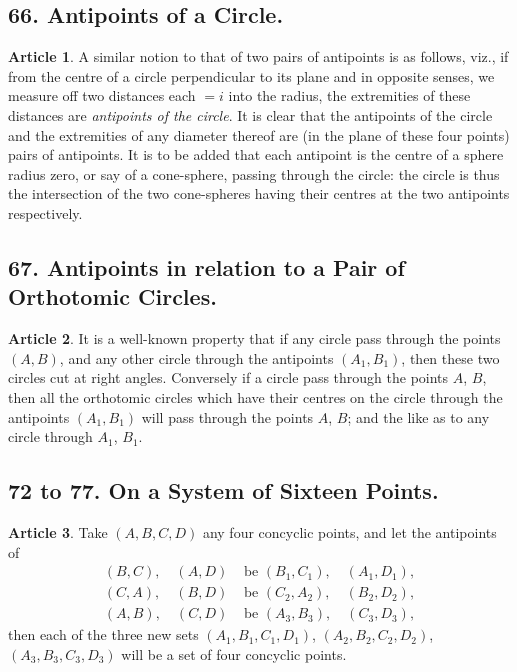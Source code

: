 \documentclass[11pt,a4paper]{article}
\theoremstyle{definition}
\newtheorem{art}{Article}
\begin{document}
\subsection{66. Antipoints of a Circle.}

\begin{art}
A similar notion to that of two pairs of antipoints is as follows, viz., if from the centre of a circle perpendicular to its plane and in opposite senses, we measure off two distances each $= i$ into the radius, the extremities of these distances are \textit{antipoints of the circle}. It is clear that the antipoints of the circle and the extremities of any diameter thereof are (in the plane of these four points) pairs of antipoints. It is to be added that each antipoint is the centre of a sphere radius zero, or say of a cone-sphere, passing through the circle: the circle is thus the intersection of the two cone-spheres having their centres at the two antipoints respectively.
\end{art}

\subsection{67. Antipoints in relation to a Pair of Orthotomic Circles.}

\begin{art}
It is a well-known property that if any circle pass through the points $(A, B)$, and any other circle through the antipoints $(A_{1}, B_{1})$, then these two circles cut at right angles. Conversely if a circle pass through the points $A$, $B$, then all the orthotomic circles which have their centres on the circle through the antipoints $(A_{1}, B_{1})$ will pass through the points $A$, $B$; and the like as to any circle through $A_{1}$, $B_{1}$.
\end{art}

\subsection{72 to 77. On a System of Sixteen Points.}

\begin{art}
Take $(A, B, C, D)$ any four concyclic points, and let the antipoints of
\begin{align*}
(B, C), \quad (A, D) &\text{ be } (B_{1}, C_{1}), \quad (A_{1}, D_{1}), \\
(C, A), \quad (B, D) &\text{ be } (C_{2}, A_{2}), \quad (B_{2}, D_{2}), \\
(A, B), \quad (C, D) &\text{ be } (A_{3}, B_{3}), \quad (C_{3}, D_{3}),
\end{align*}
then each of the three new sets $(A_{1}, B_{1}, C_{1}, D_{1})$, $(A_{2}, B_{2}, C_{2}, D_{2})$, $(A_{3}, B_{3}, C_{3}, D_{3})$ will be a set of four concyclic points.
\end{art}
\end{document}
